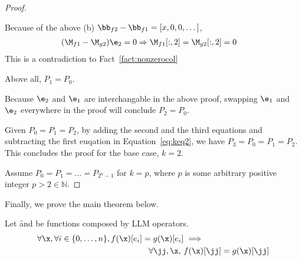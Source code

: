 \begin{proof}
\begin{enumerate}
            Because of the above (b) $\bb_{f2} - \bb_{f1} = [x,0,0,\dots]$,
            \begin{align*}
                & (\M_{f1}-\M_{g2})\e_2 = 0 \Rightarrow \M_{f1}[:,2] = \M_{g2}[:,2] = 0
            \end{align*}
            This is a contradiction to Fact~\ref{fact:nonzerocol}
    \end{enumerate}
    Above all, $P_1 = P_0$.

    Because $\e_2$ and $\e_1$ are interchangable in the above proof,
    swapping $\e_1$ and $\e_2$ everywhere in the proof will conclude $P_2 = P_0$.

    Given $P_0=P_1=P_2$, by adding the second and the third equations and subtracting the first euqation
    in Equation~\ref{eq:keq2},
    we have $P_3 = P_0 = P_1 = P_2$.
    This concludes the proof for the base case, $k=2$.

    Assume $P_0 = P_1 = \dots = P_{2^n-1}$ for $k=p$,
    where $p$ is some arbitrary positive integer $p > 2 \in \mathbb{N}$.

    \XXX



\end{proof}



Finally, we prove the main theorem below.

\begin{theorem}
Let \f and \g be functions composed by LLM operators.
\begin{align*}
    \forall \x, \forall i \in \{0,\dots,n\}, f(\x)[e_i]=g(\x)[e_i] &\implies \\
       \forall \jj,\x, \ &f(\x)[\jj]=g(\x)[\jj]
\end{align*}
\label{theorem:main}
\end{theorem}

